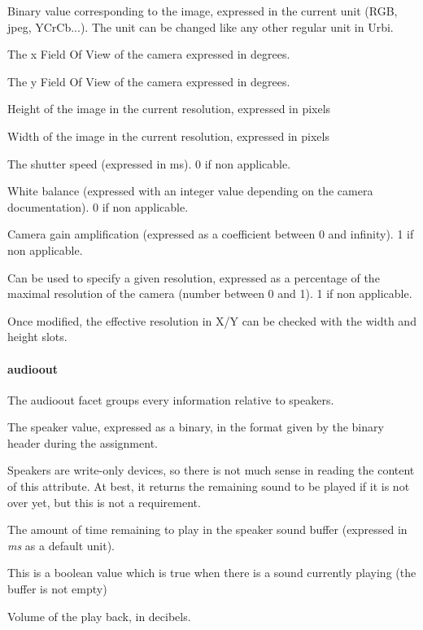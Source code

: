 \begin{slots}
  {%
    Binary value corresponding to the image, expressed in the current
    unit (RGB, jpeg, YCrCb...). The unit can be changed like any other
    regular unit in Urbi. %
  }

  {%
    The x Field Of View of the camera expressed in degrees.%
  }

  {%
    The y Field Of View of the camera expressed in degrees.%
  }

  {%
    Height of the image in the current resolution, expressed in
    pixels%
  }

  {%
    Width of the image in the current resolution, expressed in pixels%
  }

  {%
    The shutter speed (expressed in ms). 0 if non applicable.%
  }

  {%
    White balance (expressed with an integer value depending on the
    camera documentation). 0 if non applicable.%
  }

  {%
    Camera gain amplification (expressed as a coefficient between 0
    and infinity). 1 if non applicable.%
  }

  {%
    Can be used to specify a given
resolution, expressed as a percentage of the maximal resolution of the
camera (number between 0 and 1). 1 if non applicable.

Once modified, the effective resolution in X/Y can be checked with the
width and height slots.%
}

\end{slots}

\paragraph{audioout}
The audioout facet groups every information relative to speakers.

\begin{slots}
  {%
    The speaker value, expressed as a
binary, in the format given by the binary header during the
assignment.

Speakers are write-only devices, so there is not much sense in reading
the content of this attribute. At best, it returns the remaining sound
to be played if it is not over yet, but this is not a requirement.%
}

%
{%
  The amount of time remaining to play in the speaker sound buffer
  (expressed in \textit{ms} as a default unit).%
}

%
{%
  This is a boolean value which is true when there is a sound
  currently playing (the buffer is not empty)%
}

%
{%
  Volume of the play back, in decibels.%
}

\end{slots}



